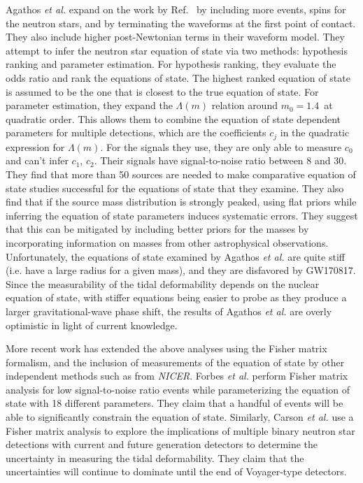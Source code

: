 Agathos \textit{et al.} \cite{Agathos:2015uaa} expand on the work by Ref.~\cite{Lackey:2014fwa} by including more events, spins for the neutron stars, and by terminating the waveforms at the first point of contact. They also include higher post-Newtonian terms  in their waveform model. They attempt to infer the neutron star equation of state via two methods: hypothesis ranking and parameter estimation. For hypothesis ranking, they evaluate the odds ratio and rank the equations of state. The highest ranked equation of state is assumed to be the one that is closest to the true equation of state. For parameter estimation, they expand the $\Lambda (m)$ relation around $m_0 = 1.4$\msun\ at quadratic order. This allows them to combine the equation of state dependent parameters for multiple detections, which are the coefficients $c_j$ in the quadratic expression for $\Lambda (m)$. For the signals they use, they are only able to measure $c_0$ and can't infer $c_1$, $c_2$. Their signals have signal-to-noise ratio between 8 and 30. They find that more than 50 sources are needed to make comparative equation of state studies successful for the equations of state that they examine. They also find that if the source mass distribution is strongly peaked, using flat priors while inferring the equation of state parameters induces systematic errors. They suggest that this can be mitigated by including better priors for the masses by incorporating information on masses from other astrophysical observations. Unfortunately, the equations of state examined by Agathos \textit{et al.} are quite stiff (i.e. have a large radius for a given mass), and they are disfavored by GW170817. Since the measurability of the tidal deformability depends on the nuclear equation of state, with stiffer equations being easier to probe as they produce a larger gravitational-wave phase shift, the results of Agathos \textit{et al.} are overly optimistic in light of current knowledge.

More recent work has extended the above analyses using the Fisher matrix formalism, and the inclusion of measurements of the equation of state by other independent methods such as from \textit{NICER}. Forbes \textit{et al.} \cite{Forbes:2019xaz} perform Fisher matrix analysis for low signal-to-noise ratio events while parameterizing the equation of state with 18 different parameters. They claim that a handful of events will be able to significantly constrain the equation of state. Similarly, Carson \textit{et al.} \cite{Carson:2019rjx} use a Fisher matrix analysis to explore the implications of multiple binary neutron star detections with current and future generation detectors to determine the uncertainty in measuring the tidal deformability. They claim that the uncertainties will continue to dominate until the end of Voyager-type detectors. 

